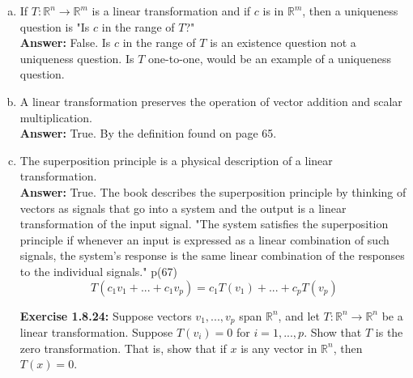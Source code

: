 \documentclass{amsart}
\def\RR{{\mathbb R}}
\begin{document}
\begin{enumerate}[(a)]
\begin{enumerate}[(a)]
\item If $T: \RR^{n} \to \RR^{m} $ is a linear transformation and if $c$ is in $\RR^{m}$, then a uniqueness question is "Is $c$ in the range of $T$?"\\
\noindent \textbf{Answer: } False. Is $c$ in the range of $T$ is an existence question not a uniqueness question. Is $T$ one-to-one, would be an example of a uniqueness question. 
\vspace{1in}

\item A linear transformation preserves the operation of vector addition and scalar multiplication.\\
\noindent \textbf{Answer: } True. By the definition found on page 65.
\vspace{1in}

\item The superposition principle is a physical description of a linear transformation.\\
\noindent \textbf{Answer: } True. The book describes the superposition principle by thinking of vectors as signals that go into a system and the output is a linear transformation of the input signal. "The system satisfies the superposition principle if whenever an input is expressed as a linear combination of such signals, the system’s response is the same linear combination of the responses to the individual signals." p(67)\\
\begin{equation}
T(c_1v_1+...+c_1v_p)=c_1T(v_1)+...+c_pT(v_p)
\end{equation} 
\vspace{1in}


\noindent\textbf{Exercise 1.8.24: } Suppose vectors $v_1,...,v_p$ span $\RR^{n}$, and let $T: \RR^{n} \to \RR^{n}$ be a linear transformation. Suppose $T(v_i)=0$ for $i=1,...,p$. Show that $T$ is the zero transformation. That is, show that if $x$ is any vector in $\RR^{n}$, then $T(x)=0$.\\


\end{enumerate}
\end{enumerate}
\end{document}
